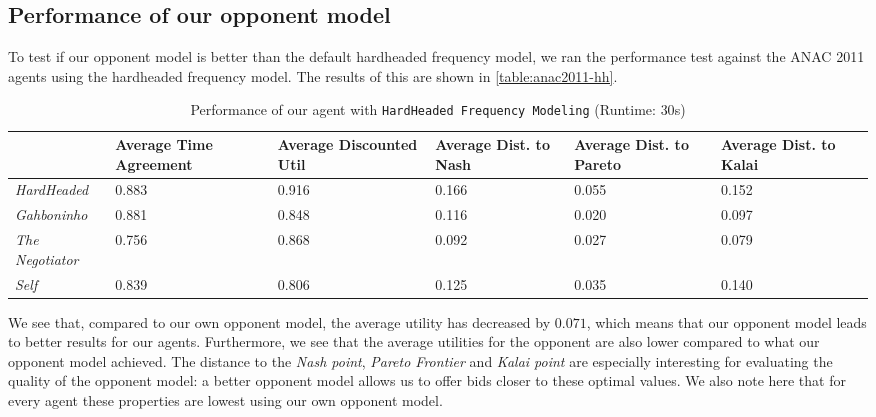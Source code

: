 \subsection{Performance of our opponent model}
To test if our opponent model is better than the default hardheaded frequency model, we ran the performance test against the ANAC 2011 agents using the hardheaded frequency model. The results of this are shown in \autoref{table:anac2011-hh}.
\begin{table}[H]
	\centering
	\small
    \begin{tabular}{l|p{2cm}|p{2cm}|p{2cm}|p{2cm}|p{2cm}|p{2cm}|}
    ~              & Average Time Agreement & Average Discounted Util & Average Dist. to Nash & Average Dist. to Pareto & Average Dist. to Kalai \\
    \hline
    \emph{HardHeaded}		& 0.883  & 0.916  & 0.166  & 0.055  & 0.152   \\ \hline
    \emph{Gahboninho}   	& 0.881  & 0.848  & 0.116  & 0.020  & 0.097   \\ \hline
    \emph{The Negotiator} 	& 0.756  & 0.868  & 0.092  & 0.027  & 0.079   \\ \hline
    \emph{Self}                 & 0.839  & 0.806  & 0.125  & 0.035  & 0.140   \\ \hline
    \end{tabular}
    \caption{Performance of our agent with \texttt{HardHeaded Frequency Modeling} (Runtime: $30$s) \label{table:anac2011-hh}}
\end{table}
We see that, compared to our own opponent model, the average utility has decreased by $0.071$, which means that our opponent model leads to  better results for our agents. 
Furthermore, we see that the average utilities for the opponent are also lower compared to what our opponent model achieved.
The distance to the \emph{Nash point}, \emph{Pareto Frontier} and \emph{Kalai point} are especially interesting for evaluating the quality of the opponent model: a better opponent model allows us to offer bids closer to these optimal values. We also note here that for every agent these properties are lowest using our own opponent model.


